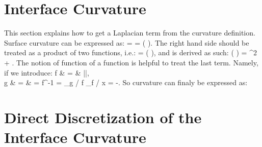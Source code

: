 \documentclass[fleqn]{article}    %
\begin{document}
\noindent

\section{Interface Curvature}
\label{sec:interface_curvature}

\noindent
This section explains how to get a Laplacian term from the curvature definition.
Surface curvature can be expressed as:
%
\be
  \kappa = \nabla {} = \nabla \cdot \left( \frac{\nabla \phi}{|\nabla \phi|} \right).
\ee
%
The right hand side should be treated as a product of two functions, i.e.:
%
\be 
  \kappa = \nabla \cdot \left( \nabla \phi \cdot {} \right),
\ee 
%
and is derived as such:
%
\be 
  \nabla \cdot \left( \nabla \phi \cdot {} \right)
= \nabla^2 \phi \cdot {}
+ \nabla \phi \cdot \nabla {}.
\ee 
%
The notion of function of a function is helpful to treat the last term. 
Namely, if we introduce:
%
\bea
  f & = & |\nabla \phi|, \\
  g & = &  = f^{-1}
\eea
%
\be
  \nabla {} 
= _{\p g / \p f}
  \cdot
  \underbrace{\nabla |\nabla \phi|}_{\p f / \p x}                 
= -.
\ee
%
So curvature can finaly be expressed as:
%

\section{Direct Discretization of the Interface Curvature}
\end{document}
